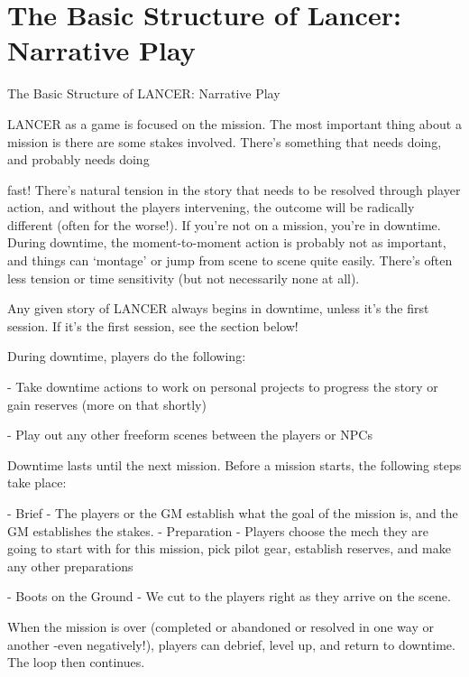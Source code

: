 
\section{The Basic Structure of Lancer: Narrative Play}
          The Basic Structure of LANCER:  
                               Narrative Play  

 LANCER as a game is focused on the mission. The most important thing about a mission is  
there are some stakes involved. There’s something that needs doing, and probably needs doing  

                                                                                           


fast! There’s natural tension in the story that needs to be resolved through player action, and  
without the players intervening, the outcome will be radically different (often for the worse!). If  
you’re not on a mission, you’re in downtime. During downtime, the moment-to-moment action is  
probably not as important, and things can ‘montage’ or jump from scene to scene quite easily.  
There’s often less tension or time sensitivity (but not necessarily none at all).   

Any given story of LANCER always begins in downtime, unless it’s the first session. If it’s the first  
session, see the section below!
 

During downtime, players do the following:
 
     -   Take downtime actions to work on personal projects to progress the story or gain  
         reserves (more on that shortly)
 
     -   Play out any other freeform scenes between the players or NPCs
 

Downtime lasts until the next mission. Before a mission starts, the following steps take place:
 
         	- Brief - The players or the GM establish what the goal of the mission is, and the GM  
         establishes the stakes.  
         - Preparation - Players choose the mech they are going to start with for this mission,  
         pick pilot gear, establish reserves, and make any other preparations
 
         	- Boots on the Ground - We cut to the players right as they arrive on the scene.
 

When the mission is over (completed or abandoned or resolved in one way or another -even  
negatively!), players can debrief, level up, and return to downtime. The loop then continues.
 


